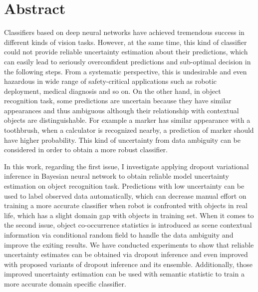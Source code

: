 
\thispagestyle{plain}

\section*{Abstract}

Classifiers based on deep neural networks have achieved tremendous success in different kinds of vision tasks. However, at the same time, this kind of classifier could not provide reliable uncertainty estimation about their predictions, which can easily lead to seriously overconfident predictions and sub-optimal decision in the following steps. From a systematic perspective, this is undesirable and even hazardous in wide range of safety-critical applications such as robotic deployment, medical diagnosis and so on. On the other hand, in object recognition task, some predictions are uncertain because they have similar appearances and thus ambiguous although their relationship with contextual objects are distinguishable. For example a marker has similar appearance with a toothbrush, when a calculator is recognized nearby, a prediction of marker should have higher probability. This kind of uncertainty from data ambiguity can be considered in order to obtain a more robust classifier.

In this work, regarding the first issue, I investigate applying dropout variational inference in Bayesian neural network to obtain reliable model uncertainty estimation on object recognition task. Predictions with low uncertainty can be used to label observed data automatically, which can decrease manual effort on training a more accurate classifier when robot is confronted with objects in real life, which has a slight domain gap with objects in training set. When it comes to the second issue, object co-occurrence statistics is introduced as scene contextual information via conditional random field to handle the data ambiguity and improve the exiting results. We have conducted experiments to show that reliable uncertainty estimates can be obtained via dropout inference and even improved with proposed variants of dropout inference and its ensemble. Additionally, those improved uncertainty estimation can be used with semantic statistic to train a more accurate domain specific classifier.

\switchlanguage{\lang} %
